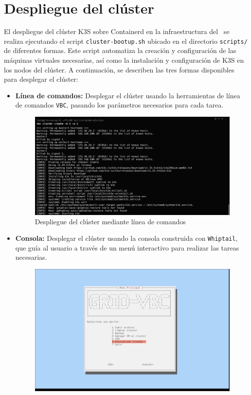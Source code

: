 \section{Despliegue del clúster}\label{sec:despliegue-cluster}
\noindent
El despliegue del clúster K3S sobre Containerd en la infraestructura del \GRID\ se realiza ejecutando el script \texttt{cluster-bootup.sh} ubicado en el directorio \texttt{scripts/} de diferentes formas. Este script automatiza la creación y configuración de las máquinas virtuales necesarias, así como la instalación y configuración de K3S en los nodos del clúster.
A continuación, se describen las tres formas disponibles para desplegar el clúster:
\begin{itemize}
    \item \textbf{Línea de comandos:} Desplegar el clúster usando la herramientas de línea de comandos \texttt{VBC}, pasando los parámetros necesarios para cada tarea.
    \begin{figure}[H]
        \centering
        \includegraphics[scale=0.15]{./tablas-images/cp6/cluster-deploy/deploy-vbc.png}
        \caption{Despliegue del clúster mediante línea de comandos}\label{fig:linea-comandos}
    \end{figure}
    \item \textbf{Consola:} Desplegar el clúster usando la consola construida con \texttt{Whiptail}, que guía al usuario a través de un menú interactivo para realizar las tareas necesarias.
    \begin{figure}[H]
        \centering
        \includegraphics[scale=0.15]{./tablas-images/cp6/cluster-deploy/deploy-console.png}

\end{figure}
\end{itemize}
